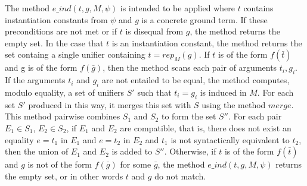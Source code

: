 \documentclass{llncs}
\begin{document}
The method $e\_ind(t,g,M,\psi)$ is intended to be applied where $t$ contains instantiation constants from $\psi$ and $g$ is a concrete ground term.
If these preconditions are not met or if $t$ is disequal from $g$, the method returns the empty set.
In the case that $t$ is an instantiation constant, the method returns the set containg a single unifier containing $t = rep_M( g )$.
If $t$ is of the form $f(\bar{t})$ and g is of the form $f(\bar{g})$, then the method scans each pair of arguments $t_i, g_i$.
If the arguments $t_i$ and $g_i$ are not entailed to be equal, the method computes, modulo equality, a set of unifiers $S'$ such that $t_i = g_i$ is induced in $M$.
For each set $S'$ produced in this way, it merges this set with $S$ using the method $merge$.
This method pairwise combines $S_1$ and $S_2$ to form the set $S''$.
For each pair $E_1 \in S_1$, $E_2 \in S_2$, if $E_1$ and $E_2$ are compatible, that is, there does not exist an equality $e = t_1$ in $E_1$ and $e = t_2$ in $E_2$ and $t_1$ is not syntactically equivalent to $t_2$, then the union of $E_1$ and $E_2$ is added to $S''$.
Otherwise, if $t$ is of the form $f(\bar{t})$ and $g$ is not of the form $f( \bar{g})$ for some $\bar{g}$, the method $e\_ind(t,g,M, \psi)$ returns the empty set, or in other words $t$ and $g$ do not match.
\end{document}
